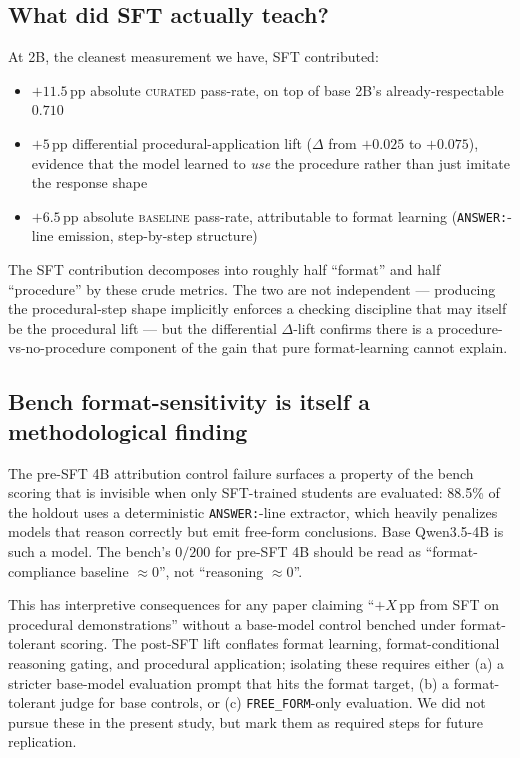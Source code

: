 \documentclass[10pt]{article}
\newcommand{\BL}{\textsc{baseline}\xspace}
\newcommand{\CU}{\textsc{curated}\xspace}
\newcommand{\Qwenf}{Qwen3.5-4B\xspace}
\begin{document}
\subsection{What did SFT actually teach?}
At 2B, the cleanest measurement we have, SFT contributed:
\begin{itemize}[leftmargin=*,nosep]
  \item $+11.5$\,pp absolute \CU{} pass-rate, on top of base 2B's already-respectable $0.710$
  \item $+5$\,pp differential procedural-application lift ($\Delta$ from $+0.025$ to $+0.075$), evidence that the model learned to \emph{use} the procedure rather than just imitate the response shape
  \item $+6.5$\,pp absolute \BL{} pass-rate, attributable to format learning (\texttt{ANSWER:}-line emission, step-by-step structure)
\end{itemize}
The SFT contribution decomposes into roughly half ``format'' and half ``procedure'' by these crude metrics. The two are not independent --- producing the procedural-step shape implicitly enforces a checking discipline that may itself be the procedural lift --- but the differential $\Delta$-lift confirms there is a procedure-vs-no-procedure component of the gain that pure format-learning cannot explain.

\subsection{Bench format-sensitivity is itself a methodological finding}
The pre-SFT 4B attribution control failure surfaces a property of the bench scoring that is invisible when only SFT-trained students are evaluated: 88.5\% of the holdout uses a deterministic \texttt{ANSWER:}-line extractor, which heavily penalizes models that reason correctly but emit free-form conclusions. Base \Qwenf{} is such a model. The bench's $0/200$ for pre-SFT 4B should be read as ``format-compliance baseline $\approx 0$'', not ``reasoning $\approx 0$''.

This has interpretive consequences for any paper claiming ``$+X$\,pp from SFT on procedural demonstrations'' without a base-model control benched under format-tolerant scoring. The post-SFT lift conflates format learning, format-conditional reasoning gating, and procedural application; isolating these requires either (a) a stricter base-model evaluation prompt that hits the format target, (b) a format-tolerant judge for base controls, or (c) \texttt{FREE\_FORM}-only evaluation. We did not pursue these in the present study, but mark them as required steps for future replication.
\end{document}
